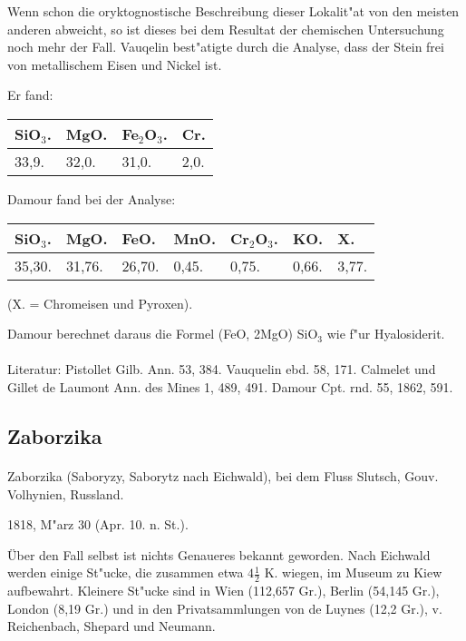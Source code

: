 \documentclass[a4paper, 11pt, oneside]{article}
\begin{document}
Wenn schon die oryktognostische Beschreibung dieser Lokalit"at von den meisten anderen abweicht, so ist dieses bei dem Resultat der chemischen Untersuchung noch mehr der Fall. Vauqelin best"atigte durch die Analyse, dass der Stein frei von metallischem Eisen und Nickel ist.

Er fand:
\begin{table}[!ht]
    \centering
    \begin{tabular}{l l l l}
        SiO$_{3}$. & MgO. & Fe$_{2}$O$_{3}$. & Cr. \\ \hline
        33,9. & 32,0. & 31,0. & 2,0. \\
    \end{tabular}
\end{table}

Damour fand bei der Analyse:
\begin{table}[!ht]
    \centering
    \begin{tabular}{l l l l l l l}
        SiO$_{3}$. & MgO. & FeO. & MnO. & Cr$_{2}$O$_{3}$. & KO. & X. \\ \hline
        35,30. & 31,76. & 26,70. & 0,45. & 0,75. & 0,66. & 3,77. \\
    \end{tabular}
\end{table}

(X. = Chromeisen und Pyroxen).

Damour berechnet daraus die Formel (FeO, 2MgO) SiO$_{3}$ wie f"ur Hyalosiderit.
\footnotesize
\paragraph{}
Literatur: Pistollet Gilb. Ann. 53, 384. Vauquelin ebd. 58, 171. Calmelet und Gillet de Laumont Ann. des Mines 1, 489, 491. Damour Cpt. rnd. 55, 1862, 591.
\subsection{Zaborzika}
\normalsize
\paragraph{}
Zaborzika (Saboryzy, Saborytz nach Eichwald), bei dem Fluss Slutsch, Gouv. Volhynien, Russland.

1818, M"arz 30 (Apr. 10. n. St.).

Über den Fall selbst ist nichts Genaueres bekannt geworden. Nach Eichwald werden einige St"ucke, die zusammen etwa $4\frac{1}{2}$ K. wiegen, im Museum zu Kiew aufbewahrt. Kleinere St"ucke sind in Wien (112,657 Gr.), Berlin (54,145 Gr.), London (8,19 Gr.) und in den Privatsammlungen von de Luynes (12,2 Gr.), v. Reichenbach, Shepard und Neumann.
\end{document}
